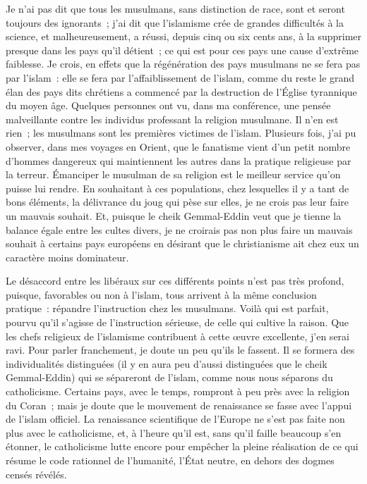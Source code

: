\documentclass[french,twoside]{book} %
\newcommand\orgName[1]{#1}
\newcommand\persName[1]{#1}
\newcommand\placeName[1]{#1}
\begin{document}
Je n’ai pas dit que tous les musulmans, sans distinction de race, sont et seront toujours des ignorants ; j’ai dit que l’islamisme crée de grandes difficultés à la science, et malheureusement, a réussi, depuis cinq ou six cents ans, à la supprimer presque dans les pays qu’il détient ; ce qui est pour ces pays une cause d’extrême faiblesse. Je crois, en effets que la régénération des pays musulmans ne se fera pas par l’islam : elle se fera par l’affaiblissement de l’islam, comme du reste le grand élan des pays dits chrétiens a commencé par la destruction de l’Église tyrannique du moyen âge. Quelques personnes ont vu, dans ma conférence, une pensée malveillante contre les individus professant la religion musulmane. Il n’en est rien ; les musulmans sont les premières victimes de l’islam. Plusieurs fois, j’ai pu observer, dans mes voyages en {\placeName Orient}, que le fanatisme vient d’un petit nombre d’hommes dangereux qui maintiennent les autres dans la pratique religieuse par la terreur. Émanciper le musulman de sa religion est le meilleur service qu’on puisse lui rendre. En souhaitant à ces populations, chez lesquelles il y a tant de bons éléments, la délivrance du joug qui pèse sur elles, je ne crois pas leur faire un mauvais souhait. Et, puisque le {\persName cheik Gemmal-Eddin} veut que je tienne la balance égale entre les cultes divers, je ne croirais pas non plus faire un mauvais souhait à certains pays européens en désirant que le christianisme ait chez eux un caractère moins dominateur.\par
Le désaccord entre les libéraux sur ces différents points n’est pas très profond, puisque, favorables ou non à l’islam, tous arrivent à la même conclusion pratique : répandre l’instruction chez les musulmans. Voilà qui est parfait, pourvu qu’il s’agisse de l’instruction sérieuse, de celle qui cultive la raison. Que les chefs religieux de l’islamisme contribuent à cette œuvre excellente, j’en serai ravi. Pour parler franchement, je doute un peu qu’ils le fassent. Il se formera des individualités distinguées (il y en aura peu d’aussi distinguées que le {\persName cheik Gemmal-Eddin}) qui se sépareront de l’islam, comme nous nous séparons du catholicisme. Certains pays, avec le temps, rompront à peu près avec la religion du Coran ; mais je doute que le mouvement de renaissance se fasse avec l’appui de l’islam officiel. La renaissance scientifique de l’{\orgName Europe} ne s’est pas faite non plus avec le catholicisme, et, à l’heure qu’il est, sans qu’il faille beaucoup s’en étonner, le catholicisme lutte encore pour empêcher la pleine réalisation de ce qui résume le code rationnel de l’humanité, l’État neutre, en dehors des dogmes censés révélés.\par
\end{document}
